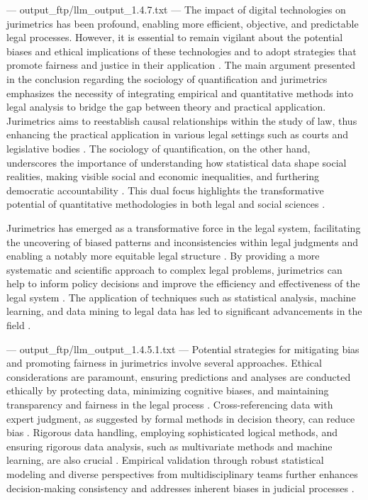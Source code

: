 ---
output_ftp/llm_output_1.4.7.txt
---
The impact of digital technologies on jurimetrics has been profound, enabling more efficient, objective, and predictable legal processes. However, it is essential to remain vigilant about the potential biases and ethical implications of these technologies and to adopt strategies that promote fairness and justice in their application \cite{nunes2018,saltelli2020,demortain2019,paiva2021,camargo2021}. The main argument presented in the conclusion regarding the sociology of quantification and jurimetrics emphasizes the necessity of integrating empirical and quantitative methods into legal analysis to bridge the gap between theory and practical application. Jurimetrics aims to reestablish causal relationships within the study of law, thus enhancing the practical application in various legal settings such as courts and legislative bodies \cite{nunes2018}. The sociology of quantification, on the other hand, underscores the importance of understanding how statistical data shape social realities, making visible social and economic inequalities, and furthering democratic accountability \cite{saltelli2020,demortain2019}. This dual focus highlights the transformative potential of quantitative methodologies in both legal and social sciences \cite{paiva2021,camargo2021}.

Jurimetrics has emerged as a transformative force in the legal system, facilitating the uncovering of biased patterns and inconsistencies within legal judgments and enabling a notably more equitable legal structure \cite{10.1007/s11186-021-09453-1,10.5040/9781350220645}. By providing a more systematic and scientific approach to complex legal problems, jurimetrics can help to inform policy decisions and improve the efficiency and effectiveness of the legal system \cite{10.1007/s11186-021-09453-1,10.5040/9781350220645}. The application of techniques such as statistical analysis, machine learning, and data mining to legal data has led to significant advancements in the field \cite{10.1007/s11186-021-09453-1,10.5040/9781350220645}.


---
output_ftp/llm_output_1.4.5.1.txt
---
Potential strategies for mitigating bias and promoting fairness in jurimetrics involve several approaches. Ethical considerations are paramount, ensuring predictions and analyses are conducted ethically by protecting data, minimizing cognitive biases, and maintaining transparency and fairness in the legal process \cite{silva2023}. Cross-referencing data with expert judgment, as suggested by formal methods in decision theory, can reduce bias \cite{zabala1809}. Rigorous data handling, employing sophisticated logical methods, and ensuring rigorous data analysis, such as multivariate methods and machine learning, are also crucial \cite{zabala1809, silva2023}. Empirical validation through robust statistical modeling and diverse perspectives from multidisciplinary teams further enhances decision-making consistency and addresses inherent biases in judicial processes \cite{nunes2018}.

